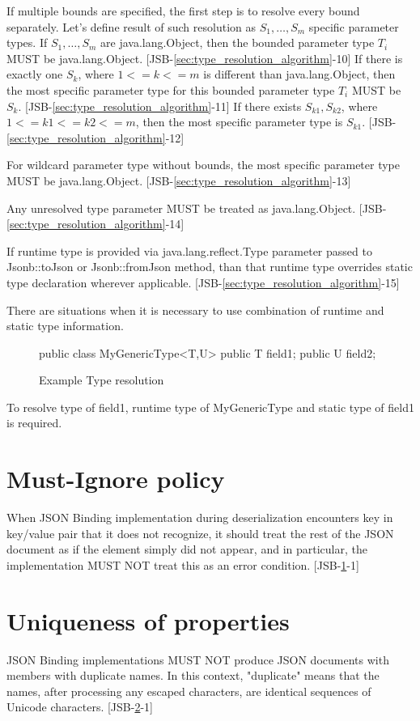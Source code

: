 If multiple bounds are specified, the first step is to resolve every bound separately. Let's define result of such resolution as \(S_1,\dotsc,S_m\) specific parameter types. If \(S_1,\dotsc,S_m\) are java.lang.Object, then the bounded parameter type \(T_i\) MUST be java.lang.Object. [JSB-\ref{sec:type_resolution_algorithm}-10] 
If there is exactly one \(S_k\), where \(1<=k<=m\) is different than java.lang.Object, then the most specific parameter type for this bounded parameter type \(T_i\) MUST be \(S_k\). [JSB-\ref{sec:type_resolution_algorithm}-11] If there exists \(S_{k1},S_{k2}\), where \(1<=k1<=k2<=m\), then the most specific parameter type is \(S_{k1}\). [JSB-\ref{sec:type_resolution_algorithm}-12]

For wildcard parameter type without bounds, the most specific parameter type MUST be java.lang.Object. [JSB-\ref{sec:type_resolution_algorithm}-13]

Any unresolved type parameter MUST be treated as java.lang.Object. [JSB-\ref{sec:type_resolution_algorithm}-14]

If runtime type is provided via java.lang.reflect.Type parameter passed to Jsonb::toJson or Jsonb::fromJson method, than that runtime type overrides static type declaration wherever applicable. [JSB-\ref{sec:type_resolution_algorithm}-15]

There are situations when it is necessary to use combination of runtime and static type information. 
\begin{figure}[hbtp]
\caption{Example Type resolution}
\label{ex2}
\begin{listing}{1}
public class MyGenericType<T,U> {
    public T field1;
    public U field2;
}\end{listing}
\end{figure}

To resolve type of field1, runtime type of MyGenericType and static type of field1 is required.

\section{Must-Ignore policy}
\label{sec:must_ignore_policy}
When JSON Binding implementation during deserialization encounters key in key/value pair that it does not recognize, it should treat the rest of the JSON document as if the element simply did not appear, and in particular, the implementation MUST NOT treat this as an error condition. [JSB-\ref{sec:must_ignore_policy}-1]

\section{Uniqueness of properties}
\label{sec:uniqueness_properties}
JSON Binding implementations MUST NOT produce JSON documents with members with duplicate names. In this context, "duplicate" means that the names, after processing any escaped characters, are identical sequences of Unicode characters. [JSB-\ref{sec:uniqueness_properties}-1]


